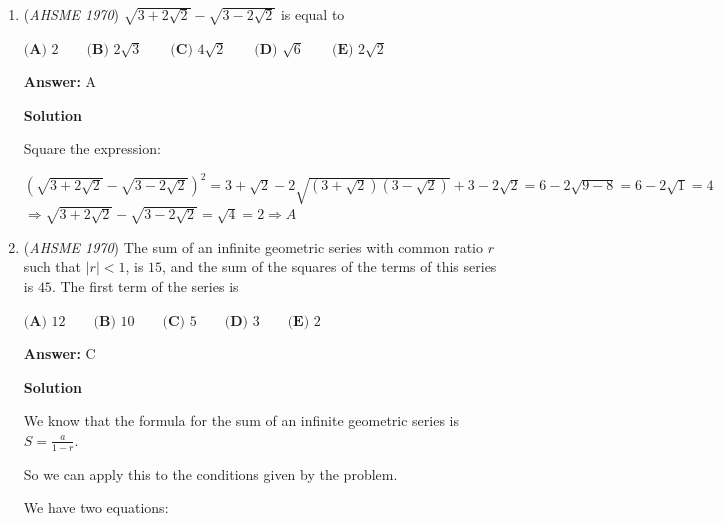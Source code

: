 \begin{enumerate}
 If $p < 0$ (which is possible but not guaranteed), we can divide the true statement $p>q$ by $p$ to get $1 > \frac{q}{p}$.  This contradicts $D$.  Thus, $D$ is sometimes false, which is bad enough to be eliminated.

 If $(p, q, r) = (3, 2, 1)$, then the condition that $pr > qr$ is satisfied.  However, $-p = -3$ and $q = 2$, so $-p > q$ is false for at least this case, eliminating $B$.

 If $(p, q, r) = (2, -3, 1)$, then $pr > qr$ is also satisfied.  However, $-\frac{q}{p} = 1.5$, so $1 > -\frac{q}{p}$ is false, eliminating $C$.

 All four options do not follow from the premises, leading to $\fbox{E}$ as the correct answer.

 


	\item (\textit{AHSME 1970}) $\sqrt{3+2\sqrt{2}}-\sqrt{3-2\sqrt{2}}$ is equal to


 $\textbf{(A) }2\qquad \textbf{(B) }2\sqrt{3}\qquad \textbf{(C) }4\sqrt{2}\qquad \textbf{(D) }\sqrt{6}\qquad  \textbf{(E) }2\sqrt{2}$

 \textbf{Answer: }A



\textbf{Solution}

Square the expression:

 $(\sqrt{3+2\sqrt{2}}-\sqrt{3-2\sqrt{2}})^2=3+\sqrt{2}-2\sqrt{(3+\sqrt{2})(3-\sqrt{2})}+3-2\sqrt{2}=6-2\sqrt{9-8}=6-2\sqrt{1}=4$
$\Rightarrow\sqrt{3+2\sqrt{2}}-\sqrt{3-2\sqrt{2}}=\sqrt{4}=2\Rightarrow\boxed{A}$



	\item (\textit{AHSME 1970}) The sum of an infinite geometric series with common ratio $r$ such that $|r|<1$, is $15$,
and the sum of the squares of the terms of this series is $45$. The first term of the series is


 $\textbf{(A) }12\qquad \textbf{(B) }10\qquad \textbf{(C) }5\qquad \textbf{(D) }3\qquad  \textbf{(E) }2$

 \textbf{Answer: }C



\textbf{Solution}

We know that the formula for the sum of an infinite geometric series is $S = \frac{a}{1-r}$.

 So we can apply this to the conditions given by the problem. 

 We have two equations:


\end{enumerate}
